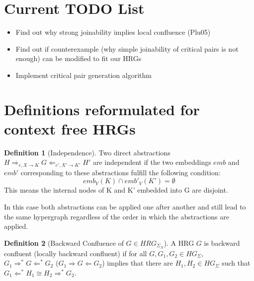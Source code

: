 \documentclass[12pt]{article}
\theoremstyle{definition}
\newtheorem{definition}{Definition}
\begin{document}
\maketitle

\begin{abstract}
In general hypergraph transformation systems confluence and backwards confluence is not decidable. This thesis explores if it is possible to decide backwards confluence for \emph{context-free} hyperedge replacement grammars (HRGs).
Additionally it shows heuristics to complete HRGs by adding additional rules that lead to a backwards confluent HRG.
\end{abstract}

\section{Current TODO List}
\begin{itemize}
\item Find out why strong joinability implies local confluence (Plu05)
\item Find out if counterexample (why simple joinability of critical pairs is not enough) can be modified to fit our HRGs
\item Implement critical pair generation algorithm
\end{itemize}

\section{Definitions reformulated for context free HRGs}
\begin{definition}[Independence]
Two direct abstractions $H \Rightarrow_{e, X \rightarrow K} G \Leftarrow_{e', X' \rightarrow K'} H' $ are independent if the two embeddings $emb$ and $emb'$ corresponding to these abstractions fulfill the following condition:
$$emb_V(K) \cap emb'_V(K') = \emptyset$$
This means the internal nodes of K and K' embedded into G are disjoint.

In this case both abstractions can be applied one after another and still lead to the same hypergraph regardless of the order in which the abstractions are applied. 
\end{definition}

\begin{definition}[Backward Confluence of $G \in HRG_{\Sigma_N}$]
A HRG $G$ is backward confluent (locally backward confluent) if for all $G, G_1, G_2 \in HG_\Sigma$, $G_1 \Rightarrow^* G \Leftarrow^* G_2$ ($G_1 \Rightarrow G \Leftarrow G_2$) implies that there are $H_1, H_2 \in HG_\Sigma$ such that $G_1 \Leftarrow^*H_1 \cong H_2 \Rightarrow^* G_2$.
\end{definition}
\end{document}
